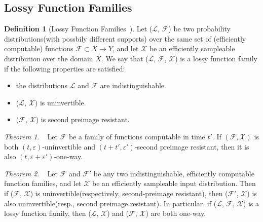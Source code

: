 \documentclass[a4paper]{article}
\theoremstyle{definition}
\newtheorem{definition}{Definition}[section]
\theoremstyle{remark}
\renewcommand{\epsilon}{\varepsilon}
\begin{document}
\subsection{Lossy Function Families}
\begin{definition}[Lossy Function Families~\cite{micciancio2013hardness}]
  Let ($\mathcal{L}$, $\mathcal{F}$) be two probability distributions(with possbily different supports) over the same set 
  of (efficiently computable) functions $\mathcal{F} \subset X \rightarrow Y$, and let $\mathcal{X}$ be an efficiently sampleable 
  distribution over the domain $X$. We say that ($\mathcal{L}$, $\mathcal{F}$, $\mathcal{X}$) is a lossy function family if 
  the following properties are satisfied:
  \begin{itemize}
    \item the distributions $\mathcal{L}$ and $\mathcal{F}$ are indistinguishable.
    \item ($\mathcal{L}$, $\mathcal{X}$) is uninvertible.
    \item ($\mathcal{F}$, $\mathcal{X}$) is second preimage resistant.
  \end{itemize}
  \newtheorem{theorem}{Theorem}
  \begin{theorem}~\cite{micciancio2013hardness}
    \label{thm:lossyfunction}
    Let $\mathcal{F}$ be a family of functions computable in time $t'$. If $(\mathcal{F}, \mathcal{X})$ is both 
    $(t, \epsilon)$-uninvertible and $(t + t', \epsilon ')$-second preimage resistant, then it is also 
    $(t, \epsilon + \epsilon ')$-one-way.
    \end{theorem}
  \begin{theorem}~\cite{micciancio2013hardness}
    Let $\mathcal{F}$ and $\mathcal{F}'$ be any two indistinguishable, efficiently computable function families,
    and let $\mathcal{X}$ be an efficiently sampleable input distribution. Then if ($\mathcal{F}$, $\mathcal{X}$)
    is uninvertible(respectively, second-preimage resistant), then ($\mathcal{F}'$, $\mathcal{X}$) is also uninvertible(resp., second
    preimage resistant). In particular, if ($\mathcal{L}$, $\mathcal{F}$, $\mathcal{X}$) is a lossy function family, then 
    ($\mathcal{L}$, $\mathcal{X}$) and ($\mathcal{F}$, $\mathcal{X}$) are both one-way.
  \end{theorem}

  \end{definition} 
\end{document}
